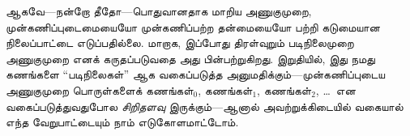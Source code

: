 \documentclass[../../../include/open-logic-section]{subfiles}
\begin{document}
ஆகவே---நன்றோ தீதோ---பொதுவானதாக மாறிய அணுகுமுறை,
முன்\-கணிப்\-பு\-டை\-மை\-யையோ முன்கணிப்பற்ற தன்மையையோ பற்றி கடுமையான
நிலைப்பாட்டை எடுப்பதில்லை. மாறாக, இப்போது திரள்வுறும் படிநிலைமுறை
அணுகுமுறை எனக் கருதப்படுவதை அது பின்பற்றுகிறது. இறுதியில், இது நமது
கணங்களை “படிநிலைகள்” ஆக வகைப்படுத்த அனுமதிக்கும்---முன்கணிப்புடைய
அணுகுமுறை பொருள்களைக் கணங்கள்$_0$, கணங்கள்$_1$, கணங்கள்$_2$,
\ldots\ என வகைப்படுத்துவதுபோல \emph{சிறிதளவு} இருக்கும்---ஆனால்
அவற்றுக்கிடையில் வகையால் எந்த வேறுபாட்டையும் நாம் எடுகோளமாட்டோம்.
\end{document}
